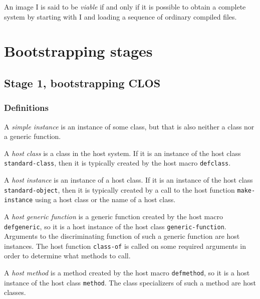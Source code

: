 An image I is said to be \emph{viable} if and only if it is possible
to obtain a complete \commonlisp{} system by starting with I and loading a
sequence of ordinary compiled files.

\section{Bootstrapping stages}

\subsection{Stage 1, bootstrapping CLOS}

\subsubsection{Definitions}

\begin{definition}
A \emph{simple instance} is an instance of some class, but that is
also neither a class nor a generic function.
\end{definition}

\begin{definition}
A \emph{host class} is a class in the host system.  If it is an
instance of the host class \texttt{standard-class}, then it is
typically created by the host macro \texttt{defclass}.
\end{definition}

\begin{definition}
A \emph{host instance} is an instance of a host class.  If it is an
instance of the host class \texttt{standard-object}, then it is
typically created by a call to the host function
\texttt{make-instance} using a host class or the name of a host class.
\end{definition}

\begin{definition}
A \emph{host generic function} is a generic function created by the
host macro \texttt{defgeneric}, so it is a host instance of the host
class \texttt{generic-function}.  Arguments to the discriminating
function of such a generic function are host instances.  The host
function \texttt{class-of} is called on some required arguments in
order to determine what methods to call.
\end{definition}

\begin{definition}
A \emph{host method} is a method created by the host macro
\texttt{defmethod}, so it is a host instance of the host class
\texttt{method}.  The class specializers of such a method are host
classes.
\end{definition}

